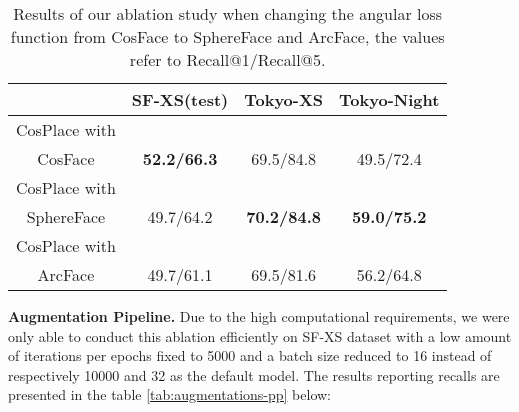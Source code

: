 \documentclass[10pt,twocolumn,letterpaper]{article}
\begin{document}
\begin{table}[htp]
  \centering
  \begin{tabular}{@{}cccc@{}}
    \toprule
     & SF-XS(test) & Tokyo-XS & Tokyo-Night\\
    \midrule
    CosPlace with\\ CosFace & \textbf{52.2/66.3} & 69.5/84.8 & 49.5/72.4 \\
    CosPlace with\\ SphereFace & 49.7/64.2 & \textbf{70.2/84.8} & \textbf{59.0/75.2} \\
    CosPlace with\\ ArcFace & 49.7/61.1 & 69.5/81.6 & 56.2/64.8\\
    \bottomrule
  \end{tabular}
  \caption{Results of our ablation study when changing the angular loss function from CosFace to SphereFace and ArcFace, the values refer to Recall@1/Recall@5.}
  \label{tab:lossablation}
\end{table}

\textbf{Augmentation Pipeline.}
Due to the high computational requirements, we were only able to conduct this ablation efficiently on SF-XS dataset with a low amount of iterations per epochs fixed to 5000 and a batch size reduced to 16 instead of respectively 10000 and 32 as the default model. The results reporting recalls are presented in the table \ref{tab:augmentations-pp} below:

\end{document}
